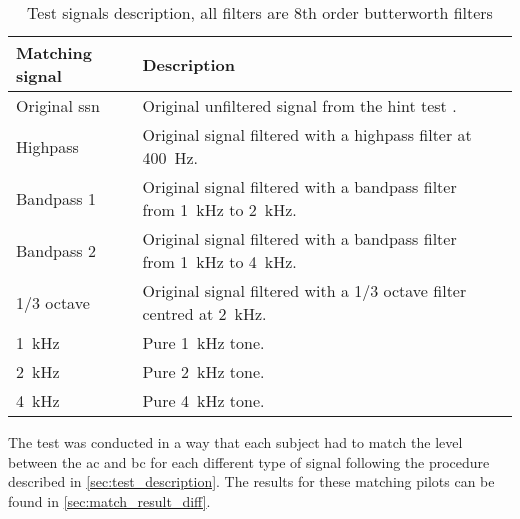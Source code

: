 \begin{table}[H]
\caption{Test signals description, all filters are 8th order butterworth filters}
\begin{tabularx}{\textwidth}{l | X l}
Matching signal       & Description \\ \hline
Original \gls{ssn}         & Original unfiltered signal from the \gls{hint} test \citep{hint_2011}.      \\
Highpass        & Original signal filtered with a highpass filter at \SI{400}{\hertz}.           \\
Bandpass 1        & Original signal filtered with a bandpass filter from \SI{1}{\kilo\hertz} to \SI{2}{\kilo\hertz}.           \\
Bandpass 2        & Original signal filtered with a bandpass filter from \SI{1}{\kilo\hertz} to \SI{4}{\kilo\hertz}.          \\
1/3 octave & Original signal filtered with a 1/3 octave filter centred at \SI{2}{\kilo\hertz}.          \\
\SI{1}{\kilo\hertz}                  & Pure \SI{1}{\kilo\hertz} tone.      \\
\SI{2}{\kilo\hertz}                 & Pure \SI{2}{\kilo\hertz} tone.          \\
\SI{4}{\kilo\hertz}                 & Pure \SI{4}{\kilo\hertz} tone.        
\end{tabularx}
\label{tab:test_signals}
\end{table}

The test was conducted in a way that each subject had to match the level between the \gls{ac} and \gls{bc} for each different type of signal following the procedure described in \autoref{sec:test_description}. The results for these matching pilots can be found in \autoref{sec:match_result_diff}.

